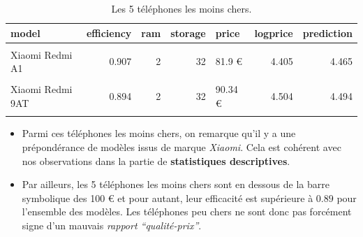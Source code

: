 \documentclass[
  12pt,
]{report}
\begin{document}
\begin{table}[!h]
\centering
\caption{\label{tab:kbl_expensive}Les 5 téléphones les moins chers.}
\centering
\begin{tabular}[t]{lrrrlrr}
\toprule
\textbf{model} & \textbf{efficiency} & \textbf{ram} & \textbf{storage} & \textbf{price} & \textbf{logprice} & \textbf{prediction}\\
\midrule
\cellcolor{gray!10}{Motorola E13} & \cellcolor{gray!10}{0.906} & \cellcolor{gray!10}{2} & \cellcolor{gray!10}{64} & \cellcolor{gray!10}{79 €} & \cellcolor{gray!10}{4.369} & \cellcolor{gray!10}{4.424}\\
Xiaomi Redmi A1 & 0.907 & 2 & 32 & 81.9 € & 4.405 & 4.465\\
\cellcolor{gray!10}{Xiaomi Redmi 9A} & \cellcolor{gray!10}{0.901} & \cellcolor{gray!10}{2} & \cellcolor{gray!10}{32} & \cellcolor{gray!10}{84.6 €} & \cellcolor{gray!10}{4.438} & \cellcolor{gray!10}{4.467}\\
Xiaomi Redmi 9AT & 0.894 & 2 & 32 & 90.34 € & 4.504 & 4.494\\
\cellcolor{gray!10}{Xiaomi Redmi A1+} & \cellcolor{gray!10}{0.901} & \cellcolor{gray!10}{2} & \cellcolor{gray!10}{32} & \cellcolor{gray!10}{98.93 €} & \cellcolor{gray!10}{4.594} & \cellcolor{gray!10}{4.621}\\
\bottomrule
\end{tabular}
\end{table}

\begin{itemize}
\item
  Parmi ces téléphones les moins chers, on remarque qu'il y a une
  prépondérance de modèles issus de marque \emph{Xiaomi}. Cela est
  cohérent avec nos observations dans la partie de \textbf{statistiques
  descriptives}.
\item
  Par ailleurs, les 5 téléphones les moins chers sont en dessous de la
  barre symbolique des 100 € et pour autant, leur efficacité est
  supérieure à \(0.89\) pour l'ensemble des modèles. Les téléphones peu
  chers ne sont donc pas forcément signe d'un mauvais \emph{rapport
  ``qualité-prix''}.
\end{itemize}
\end{document}
